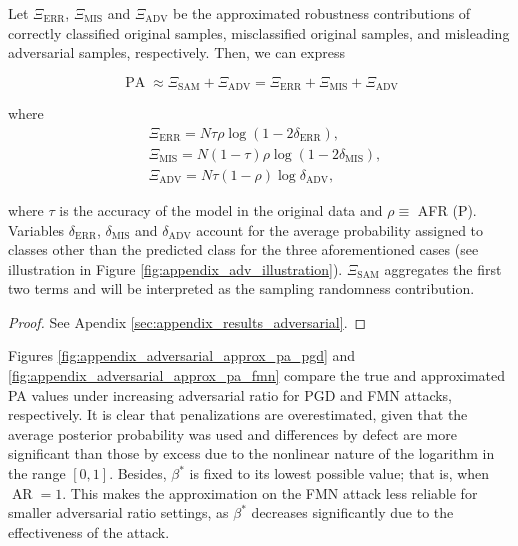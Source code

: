 \begin{theorem}
    Let $\Xi_{\text{ERR}}$, $\Xi_{\text{MIS}}$ and $\Xi_{\text{ADV}}$ be the approximated robustness
    contributions of correctly classified original samples, misclassified original samples,
    and misleading adversarial samples, respectively. Then, we can express

    $$
    \operatorname{PA} \approx \Xi_{\text{SAM}} + \Xi_{\text{ADV}} = \Xi_{\text{ERR}} + \Xi_{\text{MIS}} + \Xi_{\text{ADV}}
    $$

    where
    $$
    \begin{aligned}
        &\Xi_{\text{ERR}} = N \tau \rho \log \left( 1 - 2\delta_{\text{ERR}} \right), \\
        &\Xi_{\text{MIS}} = N (1- \tau) \rho \log \left( 1 - 2\delta_{\text{MIS}} \right), \\
        &\Xi_{\text{ADV}} = N \tau (1 - \rho) \log \delta_{\text{ADV}},
    \end{aligned}
    $$

    where $\tau$ is the accuracy of the model in the original data and $\rho \equiv$ AFR (P).
    Variables $\delta_{\text{ERR}}$, $\delta_{\text{MIS}}$ and $\delta_{\text{ADV}}$ account for the 
    average probability assigned to
    classes other than the predicted class for the three aforementioned cases 
    (see illustration in Figure \ref{fig:appendix_adv_illustration}). $\Xi_{\text{SAM}}$ aggregates
    the first two terms and will be interpreted as the sampling randomness contribution.
    \label{thm:approximated_pa}
\end{theorem}
\begin{proof}
    See Apendix \ref{sec:appendix_results_adversarial}.
\end{proof}

Figures \ref{fig:appendix_adversarial_approx_pa_pgd} and \ref{fig:appendix_adversarial_approx_pa_fmn}
compare the true and approximated PA values under increasing adversarial ratio for
PGD and FMN attacks, respectively. It is clear that penalizations are overestimated, 
given that the average posterior probability was
used and differences by defect are more significant than those by excess due to
the nonlinear nature of the logarithm in the range $[0,1]$.
Besides, $\beta^{*}$ is fixed to its lowest possible value; that
is, when $\operatorname{AR} = 1$. This makes the approximation on the FMN attack less
reliable for smaller adversarial ratio settings, as $\beta^{*}$ decreases significantly
due to the effectiveness of the attack. \\

